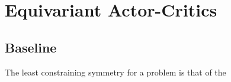 \chapter{Equivariant Actor-Critics}
\section{Baseline}
The least constraining symmetry for a problem is that of the 